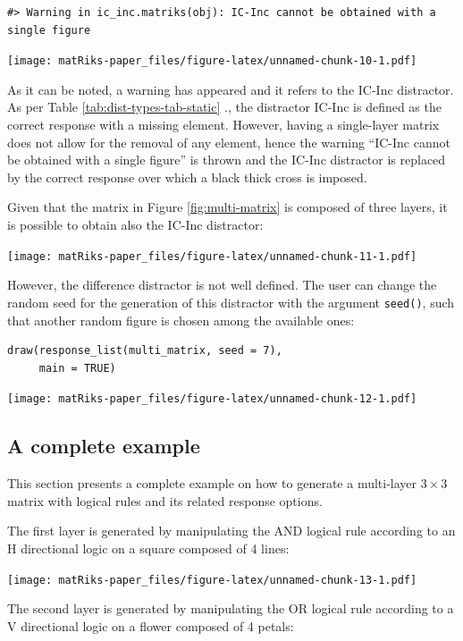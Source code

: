 \begin{verbatim}
#> Warning in ic_inc.matriks(obj): IC-Inc cannot be obtained with a single figure
\end{verbatim}

\texttt{[image: matRiks-paper\_files/figure-latex/unnamed-chunk-10-1.pdf]}

As it can be noted, a warning has appeared and it refers to the IC-Inc distractor.
As per Table \ref{tab:dist-types-tab-static} ., the distractor IC-Inc is defined as the correct response with a missing element.
However, having a single-layer matrix does not allow for the removal of any element, hence the warning ``IC-Inc cannot be obtained with a single figure'' is thrown and the IC-Inc distractor is replaced by the correct response over which a black thick cross is imposed.

Given that the matrix in Figure \ref{fig:multi-matrix} is composed of three layers, it is possible to obtain also the IC-Inc distractor:

\texttt{[image: matRiks-paper\_files/figure-latex/unnamed-chunk-11-1.pdf]}

However, the difference distractor is not well defined.
The user can change the random seed for the generation of this distractor with the argument \texttt{seed()}, such that another random figure is chosen among the available ones:

\begin{verbatim}
draw(response_list(multi_matrix, seed = 7), 
     main = TRUE)
\end{verbatim}

\texttt{[image: matRiks-paper\_files/figure-latex/unnamed-chunk-12-1.pdf]}

\subsection{A complete example}\label{a-complete-example}

This section presents a complete example on how to generate a multi-layer \(3 \times 3\) matrix with logical rules and its related response options.

The first layer is generated by manipulating the AND logical rule according to an H directional logic on a square composed of 4 lines:

\texttt{[image: matRiks-paper\_files/figure-latex/unnamed-chunk-13-1.pdf]}

The second layer is generated by manipulating the OR logical rule according to a V directional logic on a flower composed of 4 petals:

